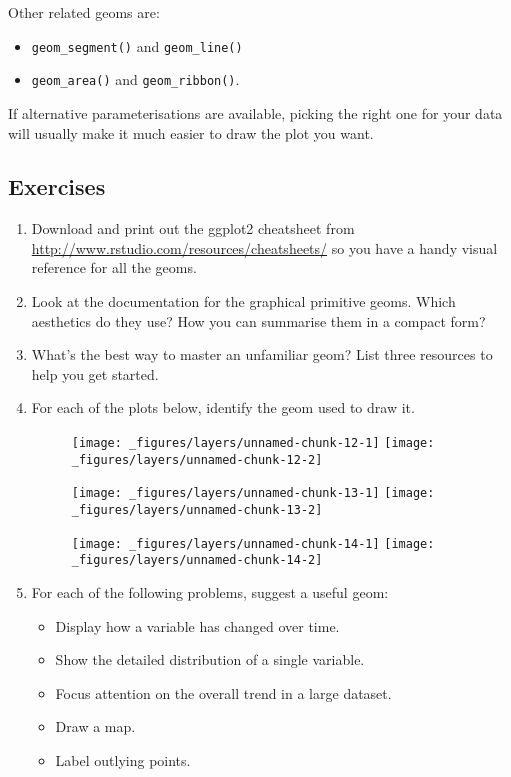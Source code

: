Other related geoms are:

\begin{itemize}
\tightlist
\item
  \texttt{geom\_segment()} and \texttt{geom\_line()}
\item
  \texttt{geom\_area()} and \texttt{geom\_ribbon()}.
\end{itemize}

If alternative parameterisations are available, picking the right one
for your data will usually make it much easier to draw the plot you
want.

\subsection{Exercises}

\begin{enumerate}
\def\labelenumi{\arabic{enumi}.}
\item
  Download and print out the ggplot2 cheatsheet from
  \url{http://www.rstudio.com/resources/cheatsheets/} so you have a
  handy visual reference for all the geoms.
\item
  Look at the documentation for the graphical primitive geoms. Which
  aesthetics do they use? How you can summarise them in a compact form?
\item
  What's the best way to master an unfamiliar geom? List three resources
  to help you get started.
\item
  For each of the plots below, identify the geom used to draw it.

  \begin{figure}[H]
    \texttt{[image: \_figures/layers/unnamed-chunk-12-1]}%
    \texttt{[image: \_figures/layers/unnamed-chunk-12-2]}
  \end{figure}

  \begin{figure}[H]
    \texttt{[image: \_figures/layers/unnamed-chunk-13-1]}%
    \texttt{[image: \_figures/layers/unnamed-chunk-13-2]}
  \end{figure}

  \begin{figure}[H]
    \texttt{[image: \_figures/layers/unnamed-chunk-14-1]}%
    \texttt{[image: \_figures/layers/unnamed-chunk-14-2]}
  \end{figure}
\item
  For each of the following problems, suggest a useful geom:

  \begin{itemize}
  \tightlist
  \item
    Display how a variable has changed over time.
  \item
    Show the detailed distribution of a single variable.
  \item
    Focus attention on the overall trend in a large dataset.
  \item
    Draw a map.
  \item
    Label outlying points.
  \end{itemize}
\end{enumerate}

